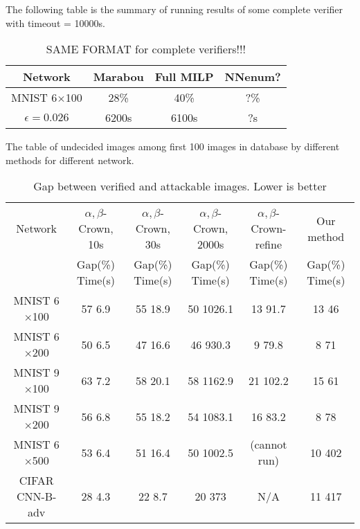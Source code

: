 The following table is the summary of running results of some complete verifier with timeout = 10000s. 

\begin{table}
	\centering
	\caption{SAME FORMAT for complete verifiers!!!}
	\label{table_complete}
	\begin{tabular}{||c||c|c|c||}
		\hline
		Network &  Marabou  & Full MILP & NNenum? \\ \hline
		MNIST 6$\times$100 & 28\% & 40\% & ?\%   \\ \hline
		$\epsilon = 0.026$ & 6200s & 6100s
		&  ?s  \\  \hline
	\end{tabular}
\end{table}


\vspace*{4ex}

The table of undecided images among first 100 images in database by different methods for different network.


\begin{table}
	\centering
	\caption{Gap between verified and attackable images. Lower is better}
	\label{table_undecided}
	\begin{tabular}{|c|c|c|c|c|c|}
		\hline
		Network & $\alpha,\beta$-Crown, 10s & $\alpha,\beta$-Crown, 30s & $\alpha,\beta$-Crown, 2000s & $\alpha,\beta$-Crown-refine & Our method \\ 
		& Gap(\%) \hfill Time(s) & Gap(\%) \hfill Time(s) & Gap(\%) \hfill Time(s) & Gap(\%) \hfill Time(s) & Gap(\%) \hfill Time(s)\\ \hline
		MNIST 6$\times$100 & 57 \hfill 6.9 & 55 \hfill 18.9 & 50 \hfill 1026.1 & 13 \hfill 91.7 & 13 \hfill 46 \\ \hline
		MNIST 6$\times$200 & 50 \hfill 6.5 & 47 \hfill 16.6 & 46 \hfill 930.3 & 9 \hfill 79.8 & 8 \hfill 71 \\ \hline
		MNIST 9$\times$100 & 63 \hfill 7.2 & 58 \hfill 20.1 & 58 \hfill 1162.9 & 21 \hfill 102.2 & 15 \hfill 61 \\ \hline
		MNIST 9$\times$200 & 56 \hfill 6.8 & 55 \hfill 18.2 & 54 \hfill 1083.1 & 16 \hfill 83.2 & 8 \hfill 78 \\ \hline
		MNIST 6$\times$500 & 53 \hfill 6.4 & 51 \hfill 16.4 & 50 \hfill 1002.5 & (cannot run) & 10 \hfill 402 \\ \hline
		CIFAR CNN-B-adv & 28 \hfill 4.3 & 22 \hfill 8.7 & 20 \hfill 373 & N/A & 11 \hfill 417 \\ \hline
	\end{tabular}
\end{table}